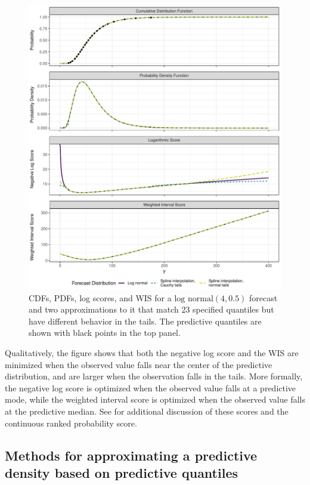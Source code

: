 \documentclass{article}
\begin{document}
\begin{figure}
    \centering
    \includegraphics[width=\textwidth]{figures/log_score_and_wis.pdf}
    \caption{CDFs, PDFs, log scores, and WIS for a $\text{log normal}(4, 0.5)$ forecast and two approximations to it that match 23 specified quantiles but have different behavior in the tails. The predictive quantiles are shown with black points in the top panel.}
    \label{fig:log_score_and_wis}
\end{figure}

Qualitatively, the figure shows that both the negative log score and the WIS are minimized when the observed value falls near the center of the predictive distribution, and are larger when the observation falls in the tails. More formally, the negative log score is optimized when the observed value falls at a predictive mode, while the weighted interval score is optimized when the observed value falls at the predictive median. See \cite{bracherEvaluatingEpidemicForecasts2021} for additional discussion of these scores and the continuous ranked probability score.

\subsection{Methods for approximating a predictive density based on predictive quantiles}
\label{subsec:log_score_wis_extrapolation_methods}
\end{document}
